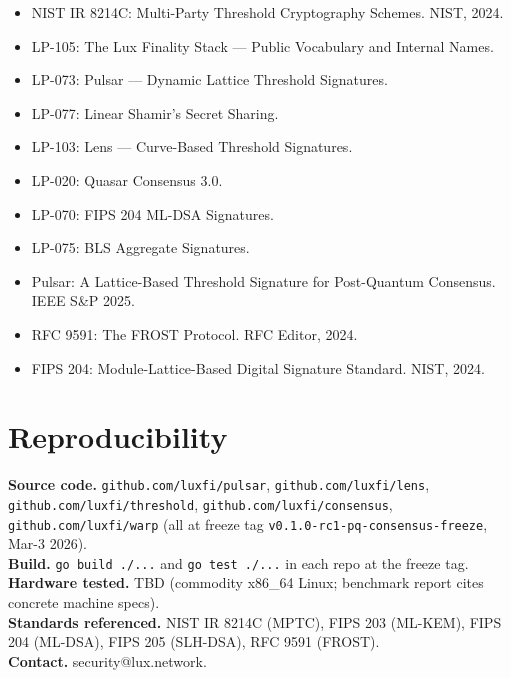 \documentclass[11pt]{article}
\begin{document}
\begin{itemize}[leftmargin=*]
\item NIST IR 8214C: Multi-Party Threshold Cryptography Schemes. NIST, 2024.
\item LP-105: The Lux Finality Stack --- Public Vocabulary and Internal Names.
\item LP-073: Pulsar --- Dynamic Lattice Threshold Signatures.
\item LP-077: Linear Shamir's Secret Sharing.
\item LP-103: Lens --- Curve-Based Threshold Signatures.
\item LP-020: Quasar Consensus 3.0.
\item LP-070: FIPS 204 ML-DSA Signatures.
\item LP-075: BLS Aggregate Signatures.
\item Pulsar: A Lattice-Based Threshold Signature for Post-Quantum
  Consensus. IEEE S\&P 2025.
\item RFC 9591: The FROST Protocol. RFC Editor, 2024.
\item FIPS 204: Module-Lattice-Based Digital Signature Standard. NIST, 2024.
\end{itemize}

\appendix
\section*{Reproducibility}
\textbf{Source code.} \texttt{github.com/luxfi/pulsar}, \texttt{github.com/luxfi/lens}, \texttt{github.com/luxfi/threshold}, \texttt{github.com/luxfi/consensus}, \texttt{github.com/luxfi/warp} (all at freeze tag \texttt{v0.1.0-rc1-pq-consensus-freeze}, Mar-3 2026).\\
\textbf{Build.} \texttt{go build ./...} and \texttt{go test ./...} in each repo at the freeze tag.\\
\textbf{Hardware tested.} TBD (commodity x86\_64 Linux; benchmark report cites concrete machine specs).\\
\textbf{Standards referenced.} NIST IR 8214C (MPTC), FIPS 203 (ML-KEM), FIPS 204 (ML-DSA), FIPS 205 (SLH-DSA), RFC 9591 (FROST).\\
\textbf{Contact.} security@lux.network.
\end{document}
